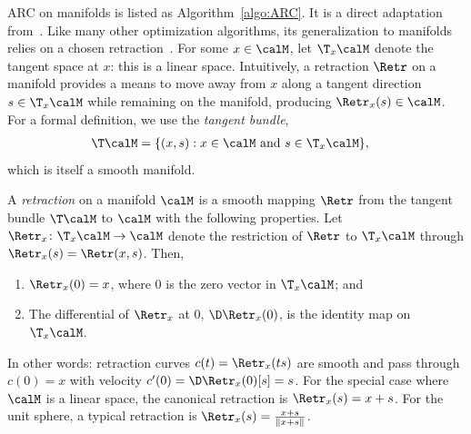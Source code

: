 ARC on manifolds is listed as Algorithm~\ref{algo:ARC}. It is a direct adaptation from~\citep{cartis2011adaptivecubic,bcgmt}. Like many other optimization algorithms, its generalization to manifolds relies on a chosen {retraction}~\citep{shub1986some,AMS08}. For some $x\in\calM$, let $\T_x\calM$ denote the tangent space at $x$: this is a linear space. Intuitively, a retraction $\Retr$ on a manifold provides a means to move away from $x$ along a tangent direction $s\in\T_x\calM$ while remaining on the manifold, producing $\Retr_x(s) \in \calM$.
For a formal definition, we use the \emph{tangent bundle},
\begin{align*}
	\T\calM & = \{ (x, s) : x \in \calM \textrm{ and } s \in \T_x\calM \},
\end{align*}
which is itself a smooth manifold.
\begin{definition} \label{def:retraction}
	A \emph{retraction} on a manifold $\calM$ is a smooth mapping $\Retr$ from the tangent bundle $\T\calM$ to $\calM$ with the following properties. Let $\Retr_x \colon \T_x\calM \to \calM$ denote the restriction of $\Retr$ to $\T_x\calM$ through $\Retr_x(s) = \Retr(x, s)$. Then,
	\begin{enumerate}
		\item[(i)] $\Retr_x(0) = x$, where $0$ is the zero vector in $\T_x\calM$; and
		\item[(ii)] The differential of $\Retr_x$ at $0$, $\D\Retr_x(0)$, is the identity map on $\T_x\calM$.
	\end{enumerate}
\end{definition}
In other words: retraction curves $c(t) = \Retr_x(ts)$ are smooth and pass through $c(0) = x$ with velocity $c'(0) = \D\Retr_x(0)[s] = s$.
For the special case where $\calM$ is a linear space, the canonical retraction is $\Retr_x(s) = x+s$. For the unit sphere, a typical retraction is $\Retr_x(s) = \frac{x+s}{\|x+s\|}$.

